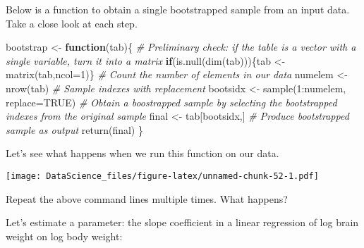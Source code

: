 \documentclass[
]{book}
\newenvironment{Shaded}{\begin{snugshade}}{\end{snugshade}}
\newcommand{\AttributeTok}[1]{\textcolor[rgb]{0.77,0.63,0.00}{#1}}
\newcommand{\CommentTok}[1]{\textcolor[rgb]{0.56,0.35,0.01}{\textit{#1}}}
\newcommand{\ConstantTok}[1]{\textcolor[rgb]{0.00,0.00,0.00}{#1}}
\newcommand{\ControlFlowTok}[1]{\textcolor[rgb]{0.13,0.29,0.53}{\textbf{#1}}}
\newcommand{\DecValTok}[1]{\textcolor[rgb]{0.00,0.00,0.81}{#1}}
\newcommand{\FunctionTok}[1]{\textcolor[rgb]{0.00,0.00,0.00}{#1}}
\newcommand{\NormalTok}[1]{#1}
\newcommand{\OtherTok}[1]{\textcolor[rgb]{0.56,0.35,0.01}{#1}}
\newcommand{\SpecialCharTok}[1]{\textcolor[rgb]{0.00,0.00,0.00}{#1}}
\begin{document}
Below is a function to obtain a single bootstrapped sample from an input data. Take a close look at each step.

\begin{Shaded}
\begin{Highlighting}[]
\NormalTok{bootstrap }\OtherTok{\textless{}{-}} \ControlFlowTok{function}\NormalTok{(tab)\{}
  \CommentTok{\# Preliminary check: if the table is a vector with a single variable, turn it into a matrix}
  \ControlFlowTok{if}\NormalTok{(}\FunctionTok{is.null}\NormalTok{(}\FunctionTok{dim}\NormalTok{(tab)))\{tab }\OtherTok{\textless{}{-}} \FunctionTok{matrix}\NormalTok{(tab,}\AttributeTok{ncol=}\DecValTok{1}\NormalTok{)\}}
  \CommentTok{\# Count the number of elements in our data}
\NormalTok{  numelem }\OtherTok{\textless{}{-}} \FunctionTok{nrow}\NormalTok{(tab)}
  \CommentTok{\# Sample indexes with replacement}
\NormalTok{  bootsidx }\OtherTok{\textless{}{-}} \FunctionTok{sample}\NormalTok{(}\DecValTok{1}\SpecialCharTok{:}\NormalTok{numelem, }\AttributeTok{replace=}\ConstantTok{TRUE}\NormalTok{)}
  \CommentTok{\# Obtain a boostrapped sample by selecting the bootstrapped indexes from the original sample}
\NormalTok{  final }\OtherTok{\textless{}{-}}\NormalTok{ tab[bootsidx,]}
  \CommentTok{\# Produce bootstrapped sample as output}
  \FunctionTok{return}\NormalTok{(final)}
\NormalTok{\}}
\end{Highlighting}
\end{Shaded}

Let's see what happens when we run this function on our data.

\begin{Shaded}
\end{Shaded}

\texttt{[image: DataScience\_files/figure-latex/unnamed-chunk-52-1.pdf]}

Repeat the above command lines multiple times. What happens?

Let's estimate a parameter: the slope coefficient in a linear regression of log brain weight on log body weight:

\begin{Shaded}
\end{Shaded}
\end{document}
